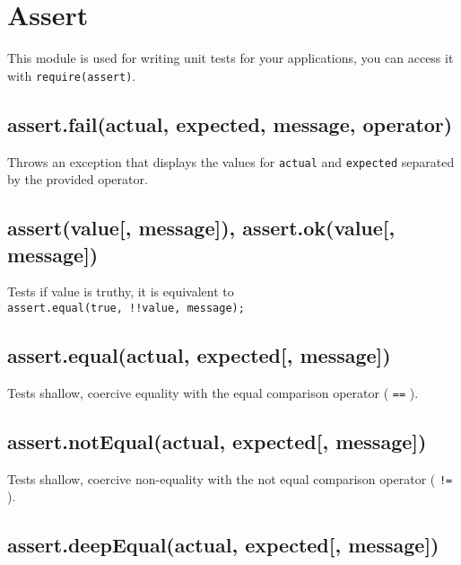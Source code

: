 \section{Assert}\label{assert}

\begin{Shaded}
\begin{Highlighting}[]
 
\end{Highlighting}
\end{Shaded}

This module is used for writing unit tests for your applications, you
can access it with
\texttt{require(\textquotesingle{}assert\textquotesingle{})}.

\subsection{assert.fail(actual, expected, message,
operator)}\label{assert.failactual-expected-message-operator}

Throws an exception that displays the values for \texttt{actual} and
\texttt{expected} separated by the provided operator.

\subsection{assert(value{[}, message{]}), assert.ok(value{[},
message{]})}\label{assertvalue-message-assert.okvalue-message}

Tests if value is truthy, it is equivalent to
\texttt{assert.equal(true,\ !!value,\ message);}

\subsection{assert.equal(actual, expected{[},
message{]})}\label{assert.equalactual-expected-message}

Tests shallow, coercive equality with the equal comparison operator (
\texttt{==} ).

\subsection{assert.notEqual(actual, expected{[},
message{]})}\label{assert.notequalactual-expected-message}

Tests shallow, coercive non-equality with the not equal comparison
operator ( \texttt{!=} ).

\subsection{assert.deepEqual(actual, expected{[},
message{]})}\label{assert.deepequalactual-expected-message}

